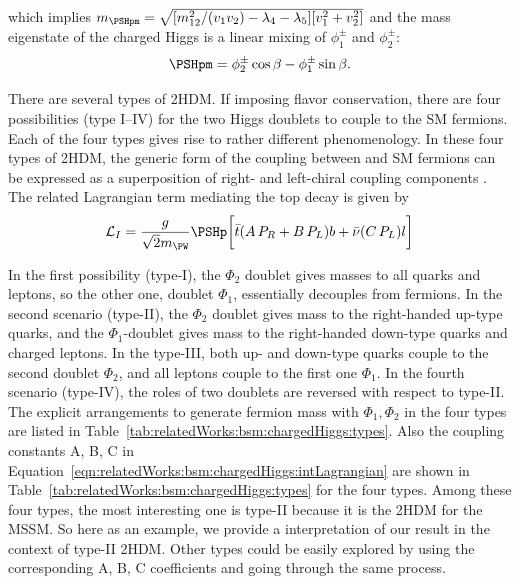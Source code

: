 \noindent which implies $m_{\PSHpm} = \sqrt{ [m_{12}^2 /(v_1 v_2) - \lambda_4 - \lambda_5] [v_1^2+v_2^2]} $ and the mass eigenstate of the charged Higgs is a linear mixing of $\phi^\pm_1$ and $\phi^\pm_2$:
\begin{equation}
\PSHpm = \phi_2^\pm \cos \beta - \phi_1^\pm \sin \beta .
\end{equation}


There are several types of 2HDM. If imposing flavor conservation, there are four possibilities (type I–IV) for the two Higgs doublets to couple to the SM fermions. Each of the four types gives rise to rather different phenomenology. In these four types of 2HDM, the generic form of the coupling between \PSHp and SM fermions can be expressed as a superposition of right- and left-chiral coupling components \cite{PhysRevD.41.3421}. The related Lagrangian term mediating the top decay is given by
\begin{equation}
	\mathcal{L}_{I} =  \frac{g  }{\sqrt{2} m_\PW} \PSHp \bigg[  \bar{t} (A \, P_R + B \, P_L) b + \bar{\nu}  (C\, P_L)  l \bigg]
    \label{eqn:relatedWorks:bsm:chargedHiggs:intLagrangian}
\end{equation}

\noindent In the first possibility (type-I), the $\Phi_2$ doublet gives masses to all quarks and leptons, so the other one, doublet $\Phi_1$, essentially decouples from fermions. In the second scenario (type-II), the $\Phi_2$ doublet gives mass to the right-handed up-type quarks, and the $\Phi_1$-doublet gives mass to the right-handed down-type quarks and charged leptons. In the type-III, both up- and down-type quarks couple to the second doublet $\Phi_2$, and all leptons couple to the first one $\Phi_1$. In the fourth scenario (type-IV), the roles of two doublets are reversed with respect to type-II. The explicit arrangements to generate fermion mass with $\Phi_1,\Phi_2$ in the four types are listed in Table~\ref{tab:relatedWorks:bsm:chargedHiggs:types}. Also the coupling constants A, B, C in Equation~\ref{eqn:relatedWorks:bsm:chargedHiggs:intLagrangian} are shown in  Table~\ref{tab:relatedWorks:bsm:chargedHiggs:types} for the four types. Among these four types, the most interesting one is type-II because it is the 2HDM for the MSSM. So here as an example, we provide a interpretation of our result in the context of type-II 2HDM. Other types could be easily explored by using the corresponding A, B, C coefficients and going through the same process.

